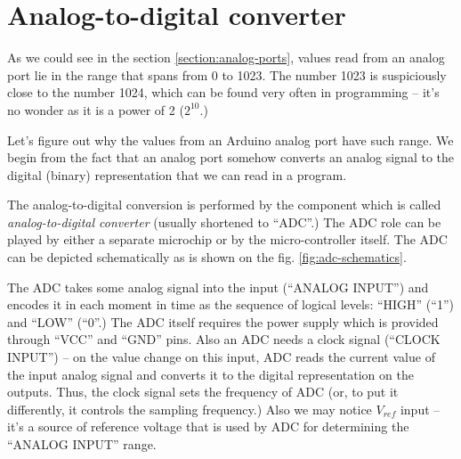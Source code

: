 \documentclass[../sparc.tex]{subfiles}
\begin{document}
\section{Analog-to-digital converter}

As we could see in the section \ref{section:analog-ports}, values read from an
analog port lie in the range that spans from 0 to 1023.  The number 1023 is
suspiciously close to the number 1024, which can be found very often in
programming -- it's no wonder as it is a power of 2 ($2^{10}$.)

Let's figure out why the values from an Arduino analog port have such range.  We
begin from the fact that an analog port somehow converts an analog signal to the
digital (binary) representation that we can read in a program.

The analog-to-digital conversion is performed by the component which is called
\emph{analog-to-digital converter} (usually shortened to ``ADC''.)  The ADC role
can be played by either a separate microchip or by the micro-controller itself.
The ADC can be depicted schematically as is shown on the
fig. \ref{fig:adc-schematics}.


The ADC takes some analog signal into the input (``ANALOG INPUT'') and encodes
it in each moment in time as the sequence of logical levels: ``HIGH'' (``1'')
and ``LOW'' (``0''.)  The ADC itself requires the power supply which is provided
through ``VCC'' and ``GND'' pins.  Also an ADC needs a clock signal (``CLOCK
INPUT'') -- on the value change on this input, ADC reads the current value of the
input analog signal and converts it to the digital representation on the
outputs.  Thus, the clock signal sets the frequency of ADC (or, to put it
differently, it controls the sampling frequency.)  Also we may notice $V_{ref}$
input -- it's a source of reference voltage that is used by ADC for determining
the ``ANALOG INPUT'' range.

\end{document}
